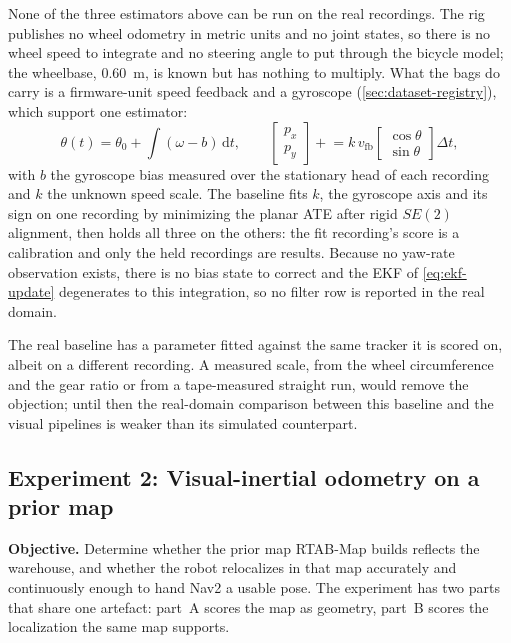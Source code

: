 None of the three estimators above can be run on the real recordings. The rig
publishes no wheel odometry in metric units and no joint states, so there is no
wheel speed to integrate and no steering angle to put through the bicycle model;
the wheelbase, \SI{0.60}{\metre}, is known but has nothing to multiply. What the
bags do carry is a firmware-unit speed feedback and a gyroscope
(\cref{sec:dataset-registry}), which support one estimator:
\begin{equation}
  \theta(t) = \theta_0 + \int (\omega - b)\,\mathrm{d}t, \qquad
  \begin{bmatrix}p_x\\p_y\end{bmatrix} \mathrel{+}=
  k\,v_{\text{fb}} \begin{bmatrix}\cos\theta\\ \sin\theta\end{bmatrix} \Delta t,
  \label{eq:real-deadreckon}
\end{equation}
with $b$ the gyroscope bias measured over the stationary head of each recording
and $k$ the unknown speed scale. The baseline fits $k$, the gyroscope axis and its sign on one recording by minimizing the planar ATE
after rigid $SE(2)$ alignment, then holds all three on the others: the fit
recording's score is a calibration and only the held recordings are results.
Because no yaw-rate observation exists, there is no bias state to correct and
the EKF of \cref{eq:ekf-update} degenerates to this integration, so no filter
row is reported in the real domain.

\begin{queried}
The real baseline has a parameter fitted against the same tracker it is scored
on, albeit on a different recording. A measured scale, from the wheel
circumference and the gear ratio or from a tape-measured straight run, would
remove the objection; until then the real-domain comparison between this
baseline and the visual pipelines is weaker than its simulated counterpart.
\end{queried}


\subsection{Experiment 2: Visual-inertial odometry on a prior map}
\label{sec:exp2-method}

\textbf{Objective.} Determine whether the prior map RTAB-Map builds reflects
the warehouse, and whether the robot relocalizes in that map accurately and
continuously enough to hand Nav2 a usable pose. The experiment has two parts
that share one artefact: part~A scores the map as geometry, part~B scores the
localization the same map supports.

